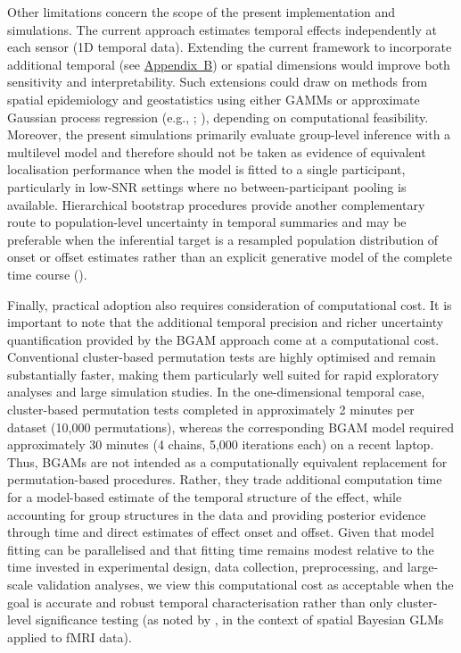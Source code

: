 \documentclass[
  doc,
  floatsintext,
  longtable,
  a4paper,
  nolmodern,
  notxfonts,
  notimes,
  colorlinks=true,linkcolor=blue,citecolor=blue,urlcolor=blue]{apa7}
\begin{document}
Other limitations concern the scope of the present implementation and
simulations. The current approach estimates temporal effects
independently at each sensor (1D temporal data). Extending the current
framework to incorporate additional temporal (see
\hyperref[apx-2D]{Appendix~B}) or spatial dimensions would improve both
sensitivity and interpretability. Such extensions could draw on methods
from spatial epidemiology and geostatistics using either GAMMs or
approximate Gaussian process regression (e.g.,
;
), depending on computational feasibility. Moreover, the present
simulations primarily evaluate group-level inference with a multilevel
model and therefore should not be taken as evidence of equivalent
localisation performance when the model is fitted to a single
participant, particularly in low-SNR settings where no
between-participant pooling is available. Hierarchical bootstrap
procedures provide another complementary route to population-level
uncertainty in temporal summaries and may be preferable when the
inferential target is a resampled population distribution of onset or
offset estimates rather than an explicit generative model of the
complete time course ().

Finally, practical adoption also requires consideration of computational
cost. It is important to note that the additional temporal precision and
richer uncertainty quantification provided by the BGAM approach come at
a computational cost. Conventional cluster-based permutation tests are
highly optimised and remain substantially faster, making them
particularly well suited for rapid exploratory analyses and large
simulation studies. In the one-dimensional temporal case, cluster-based
permutation tests completed in approximately 2 minutes per dataset
(10,000 permutations), whereas the corresponding BGAM model required
approximately 30 minutes (4 chains, 5,000 iterations each) on a recent
laptop. Thus, BGAMs are not intended as a computationally equivalent
replacement for permutation-based procedures. Rather, they trade
additional computation time for a model-based estimate of the temporal
structure of the effect, while accounting for group structures in the
data and providing posterior evidence through time and direct estimates
of effect onset and offset. Given that model fitting can be parallelised
and that fitting time remains modest relative to the time invested in
experimental design, data collection, preprocessing, and large-scale
validation analyses, we view this computational cost as acceptable when
the goal is accurate and robust temporal characterisation rather than
only cluster-level significance testing (as noted by
, in the context
of spatial Bayesian GLMs applied to fMRI data).
\end{document}
